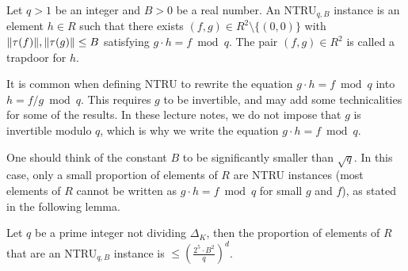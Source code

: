 \begin{definition}
Let $q >1$ be an integer and $B >0$ be a real number. An NTRU$_{q,B}$ instance is an element $h \in R$ such that there exists $(f,g) \in R^2\setminus \{(0,0)\}$ with $\|\tau(f)\|, \|\tau(g)\| \leq B$ satisfying $g \cdot h = f \bmod q$. The pair $(f,g) \in R^2$ is called a trapdoor for $h$.
\end{definition}

It is common when defining NTRU to rewrite the equation $g \cdot h = f \bmod q$ into $h = f/g \bmod q$. This requires $g$ to be invertible, and may add some technicalities for some of the results. In these lecture notes, we do not impose that $g$ is invertible modulo $q$, which is why we write the equation $g \cdot h = f \bmod q$.

One should think of the constant $B$ to be significantly smaller than $\sqrt{q}$. In this case, only a small proportion of elements of $R$ are NTRU instances (most elements of $R$ cannot be written as $g \cdot h = f \bmod q$ for small $g$ and $f$), as stated in the following lemma.

\begin{lemma}
\label{lemma:proportion-NTRU-instances}
Let $q$ be a prime integer not dividing $\Delta_K$, then the proportion of elements of $R$ that are an NTRU$_{q,B}$ instance is $\leq \left( \frac{2^5 \cdot B^2}{q}\right)^d$.
\end{lemma}

